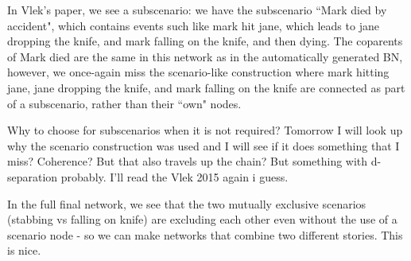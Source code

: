 In Vlek's paper, we see a subscenario: we have the subscenario ``Mark died by accident", which contains events such like mark hit jane, which leads to jane dropping the knife, and mark falling on the knife, and then dying. The coparents of Mark died are the same in this network as in the automatically generated BN, however, we once-again miss the scenario-like construction where mark hitting jane, jane dropping the knife, and mark falling on the knife are connected as part of a subscenario, rather than their ``own" nodes.


Why to choose for subscenarios when it is not required? Tomorrow I will look up why the scenario construction was used and I will see if it does something that I miss? Coherence? But that also travels up the chain? But something with d-separation probably. I'll read the Vlek 2015 again i guess.



In the full final network, we see that the two mutually exclusive scenarios (stabbing vs falling on knife) are excluding each other even without the use of a scenario node - so we can make networks that combine two different stories. This is nice.

